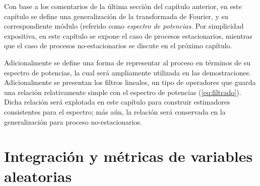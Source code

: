 \documentclass[12pt,letterpaper]{book}
\begin{document}
Con base a los comentarios de la última sección del capítulo anterior, en este capítulo se define una generalización de la transformada de Fourier, y su correspondiente módulo (referido como \textit{espectro de potencias}.
%
Por simplicidad expositiva, en este capítulo se expone el caso de procesos estacionarios, mientras que el caso de procesos no-estacionarios se discute en el próximo capítulo.

Adicionalmente se define una forma de representar al proceso en términos de su espectro de potencias, la cual será ampliamente utilizada en las demostraciones.
%
Adicionalmente se presentan los filtros lineales, un tipo de operadores que guarda una {relación} relativamente simple con el espectro de potencias (\ref{eq:filtrado}). Dicha relación será explotada en este capítulo para construir estimadores consistentes para el espectro; más aún, la relación
será conservada en la generalización para proceso no-estacionarios.

%

%


\section{Integración y métricas de variables aleatorias}
\end{document}
